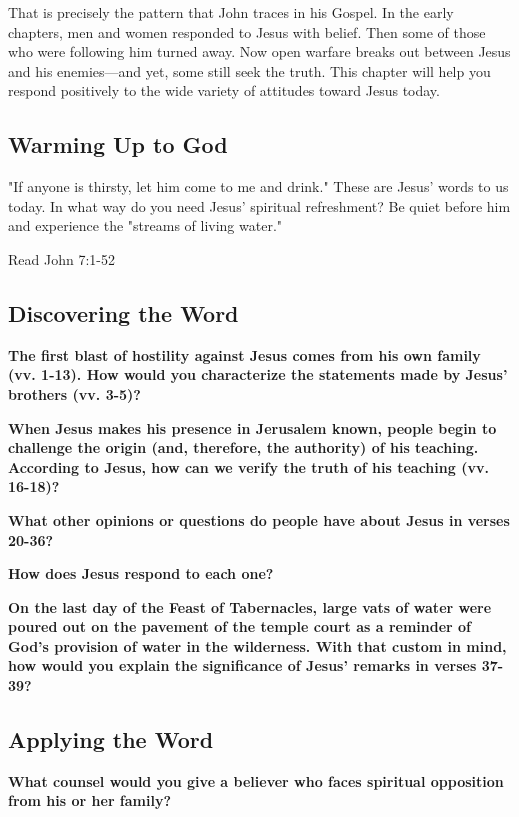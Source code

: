 \documentclass[11pt]{article}
\begin{document}
That is precisely the pattern that John traces in his Gospel. In the
early chapters, men and women responded to Jesus with belief. Then
some of those who were following him turned away. Now open warfare
breaks out between Jesus and his enemies—and yet, some still seek the
truth. This chapter will help you respond positively to the wide
variety of attitudes toward Jesus today.

\subsection{Warming Up to God}
\label{sec:org338a2ba}

"If anyone is thirsty, let him come to me and drink." These are
Jesus’ words to us today. In what way do you need Jesus’ spiritual
refreshment? Be quiet before him and experience the "streams of
living water."

Read John 7:1-52

\subsection{Discovering the Word}
\label{sec:orgdb19f1f}

\textbf{\textbf{The first blast of hostility against Jesus comes from his own family (vv. 1-13). How would you characterize the statements made by Jesus' brothers (vv. 3-5)?}}

\textbf{\textbf{When Jesus makes his presence in Jerusalem known, people begin to challenge the origin (and, therefore, the authority) of his teaching. According to Jesus, how can we verify the truth of his teaching (vv. 16-18)?}}

\textbf{\textbf{What other opinions or questions do people have about Jesus in verses 20-36?}}

\textbf{\textbf{How does Jesus respond to each one?}}

\textbf{\textbf{On the last day of the Feast of Tabernacles, large vats of water were poured out on the pavement of the temple court as a reminder of God's provision of water in the wilderness. With that custom in mind, how would you explain the significance of Jesus' remarks in verses 37-39?}}

\subsection{Applying the Word}
\label{sec:org13837e3}

\textbf{\textbf{What counsel would you give a believer who faces spiritual opposition from his or her family?}}
\end{document}
